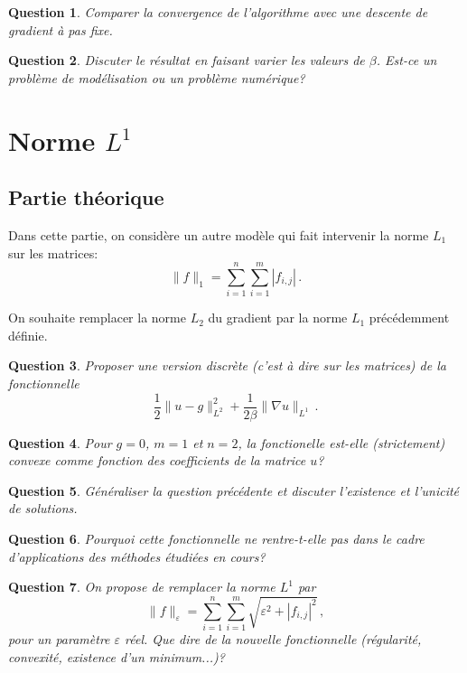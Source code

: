 \documentclass[10pt,a4paper,fleqn]{report}
\newtheorem{question}{Question}
\begin{document}
\begin{question}
Comparer la convergence de l'algorithme avec une descente de gradient \`a pas fixe.
\end{question}

\begin{question}
Discuter le r\'esultat en faisant varier les valeurs de $\beta$. Est-ce un probl\`eme de mod\'elisation ou un problème num\'erique?
\end{question}


\section{Norme $L^{1}$}
\subsection{Partie théorique}
Dans cette partie, on consid\`ere un autre mod\`ele qui fait intervenir la norme $L_1$ sur les matrices:
\begin{equation}
\| f \|_{1} = \sum_{i=1}^n \sum_{i=1}^m |f_{i,j}| \,.
\end{equation}

On souhaite remplacer la norme $L_2$ du gradient par la norme $L_1$ pr\'ec\'edemment d\'efinie.

\begin{question}
Proposer une version discr\`ete (c'est \`a dire sur les matrices) de la fonctionnelle $$ \frac12 \| u -  g\|^2_{L^2} + \frac{1}{2\beta}\| \nabla u \|_{L^1}\,.$$
\end{question}

\begin{question}
Pour $g=0$, $m=1$ et $n=2$, la fonctionelle est-elle (strictement) convexe comme fonction des coefficients de la matrice $u$?
\end{question}

\begin{question}
G\'en\'eraliser la question pr\'ec\'edente et discuter l'existence et l'unicit\'e de solutions.
\end{question}

\begin{question}
Pourquoi cette fonctionnelle ne rentre-t-elle pas dans le cadre d'applications des m\'ethodes \'etudi\'ees en cours?
\end{question}

\begin{question}
On propose de remplacer la norme $L^1$ par 
\begin{equation}
\| f \|_{\varepsilon} = \sum_{i=1}^n \sum_{i=1}^m \sqrt{\varepsilon^2 + |f_{i,j}|^2} \,,
\end{equation}
pour un param\`etre $\varepsilon$ r\'eel.
Que dire de la nouvelle fonctionnelle (r\'egularit\'e, convexit\'e, existence d'un minimum...)?
\end{question}
\end{document}
